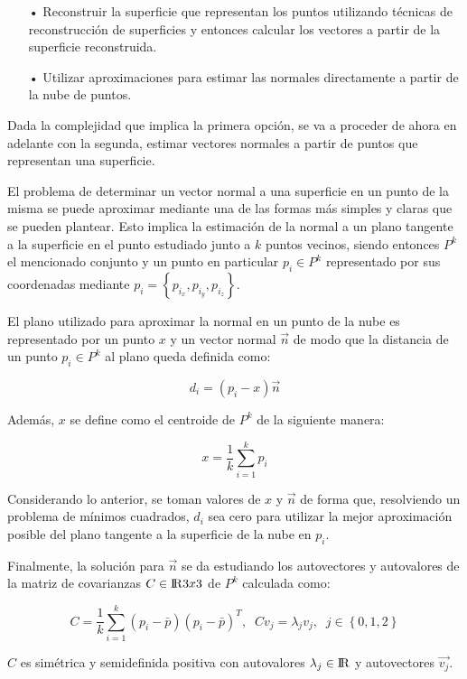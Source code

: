 \begin{itemize}
\item[•]Reconstruir la superficie que representan los puntos utilizando técnicas de reconstrucción de superficies y entonces calcular los vectores a partir de la superficie reconstruida.
\item[•]Utilizar aproximaciones para estimar las normales directamente a partir de la nube de puntos.
\end{itemize}

Dada la complejidad que implica la primera opción, se va a proceder de ahora en adelante con la segunda, estimar vectores normales a partir de puntos que representan una superficie.

El problema de determinar un vector normal a una superficie en un punto de la misma se puede aproximar mediante una de las formas más simples y claras que se pueden plantear. Esto implica la estimación de la normal a un plano tangente a la superficie en el punto estudiado junto a $k$ puntos vecinos, siendo entonces $P^k$ el mencionado conjunto y un punto en particular $p_{i} \in P^{k}$ representado por sus coordenadas mediante $p_{i}=\left\lbrace p_{i_x},p_{i_y},p_{i_z} \right\rbrace$.

El plano utilizado para aproximar la normal en un punto de la nube es representado por un punto $x$ y un vector normal $\vec{n}$ de modo que la distancia de un punto $p_{i} \in P^{k}$ al plano queda definida como:

$$d_i=(p_{i}-x)\vec{n}$$

Además, $x$ se define como el centroide de $P^{k}$ de la siguiente manera:

$$x=\frac{1}{k}\sum_{i=1}^{k} p_i$$

Considerando lo anterior, se toman valores de $x$ y $\vec{n}$ de forma que, resolviendo un problema de mínimos cuadrados, $d_i$ sea cero para utilizar la mejor aproximación posible del plano tangente a la superficie de la nube en $p_i$.

Finalmente, la solución para $\vec{n}$ se da estudiando los autovectores y autovalores de la matriz de covarianzas $C \in {\rm I\!R} 3x3$ de $P^{k}$ calculada como:

$$C=\frac{1}{k}\sum_{i=1}^{k} (p_i-\bar{p})(p_i-\bar{p})^T,\;\;Cv_{j}=\lambda_{j}v_{j},\;\;j \in \left\lbrace 0,1,2 \right\rbrace$$

$C$ es simétrica y semidefinida positiva con autovalores $\lambda_j \in {\rm I\!R} $ y autovectores $\vec{v_j}$.

